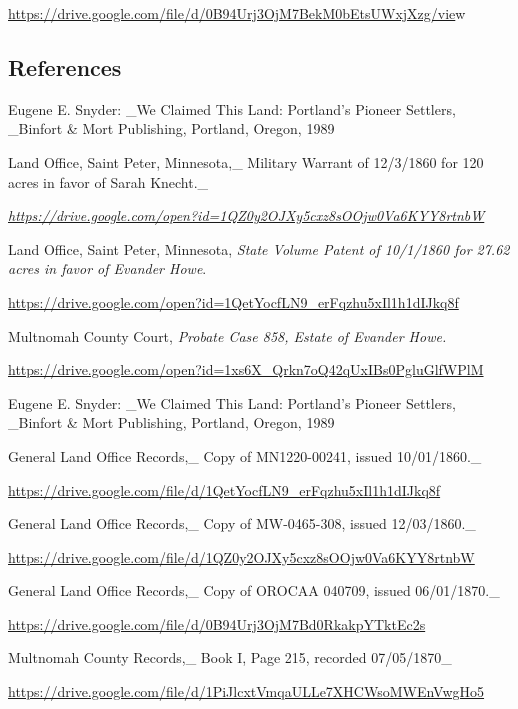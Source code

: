 \documentclass[
  12pt,
]{book}
\begin{document}
\href{https://drive.google.com/file/d/0B94Urj3OjM7BekM0bEtsUWxjXzg/view}{https://drive.google.com/file/d/0B94Urj3OjM7BekM0bEtsUWxjXzg/vie}w

\hypertarget{references-3}{%
\subsection{References}\label{references-3}}

Eugene E. Snyder: \_We Claimed This Land: Portland's Pioneer Settlers, \_Binfort \& Mort Publishing, Portland, Oregon, 1989

Land Office, Saint Peter, Minnesota,\_ Military Warrant of 12/3/1860 for 120 acres in favor of Sarah Knecht.\_

\emph{\url{https://drive.google.com/open?id=1QZ0y2OJXy5cxz8sOOjw0Va6KYY8rtnbW}}

Land Office, Saint Peter, Minnesota, \emph{State Volume Patent of 10/1/1860 for 27.62 acres in favor of Evander Howe}.

\url{https://drive.google.com/open?id=1QetYocfLN9_erFqzhu5xIl1h1dIJkq8f}

Multnomah County Court, \emph{Probate Case 858, Estate of Evander Howe.}

\url{https://drive.google.com/open?id=1xs6X_Qrkn7oQ42qUxIBs0PgluGlfWPlM}

Eugene E. Snyder: \_We Claimed This Land: Portland's Pioneer Settlers, \_Binfort \& Mort Publishing, Portland, Oregon, 1989

General Land Office Records,\_ Copy of MN1220-00241, issued 10/01/1860.\_

\href{https://drive.google.com/file/d/1QetYocfLN9_erFqzhu5xIl1h1dIJkq8f/view}{https://drive.google.com/file/d/1QetYocfLN9\_erFqzhu5xIl1h1dIJkq8f}

General Land Office Records,\_ Copy of MW-0465-308, issued 12/03/1860.\_

\href{https://drive.google.com/file/d/1QZ0y2OJXy5cxz8sOOjw0Va6KYY8rtnbW/view}{https://drive.google.com/file/d/1QZ0y2OJXy5cxz8sOOjw0Va6KYY8rtnbW}

General Land Office Records,\_ Copy of OROCAA 040709, issued 06/01/1870.\_

\url{https://drive.google.com/file/d/0B94Urj3OjM7Bd0RkakpYTktEc2s}

Multnomah County Records,\_ Book I, Page 215, recorded 07/05/1870\_

\href{https://drive.google.com/file/d/1PiJlcxtVmqaULLe7XHCWsoMWEnVwgHo5/view}{https://drive.google.com/file/d/1PiJlcxtVmqaULLe7XHCWsoMWEnVwgHo5}
\end{document}
